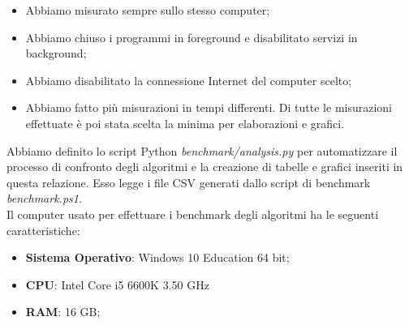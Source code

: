 \begin{itemize}
    \item Abbiamo misurato sempre sullo stesso computer;
    \item Abbiamo chiuso i programmi in foreground e disabilitato servizi in background;
    \item Abbiamo disabilitato la connessione Internet del computer scelto;
    \item Abbiamo fatto più misurazioni in tempi differenti. Di tutte le misurazioni effettuate è poi stata scelta la minima per elaborazioni e grafici.
\end{itemize}

\noindent Abbiamo definito lo script Python \textit{benchmark/analysis.py} per automatizzare il processo di confronto degli algoritmi e la creazione di tabelle e grafici inseriti in questa relazione. Esso legge i file CSV generati dallo script di benchmark \textit{benchmark.ps1}. \\

\noindent Il computer usato per effettuare i benchmark degli algoritmi ha le seguenti caratteristiche:

\begin{itemize}
    \item \textbf{Sistema Operativo}: Windows 10 Education 64 bit;
    \item \textbf{CPU}: Intel Core i5 6600K 3.50 GHz
    \item \textbf{RAM}: 16 GB;
\end{itemize}
